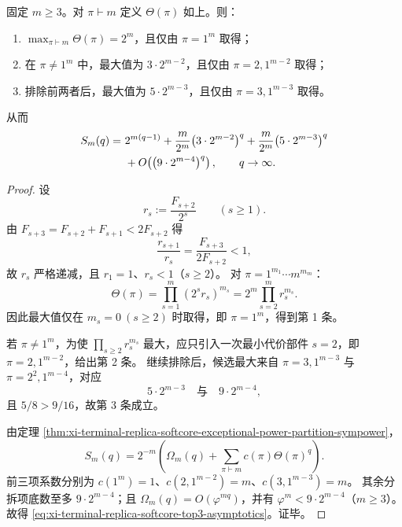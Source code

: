 \begin{theorem}\label{thm:xi-terminal-replica-softcore-partition-weight-hierarchy-asymptotics}
固定 \(m\ge 3\)。对 \(\pi\vdash m\) 定义 \(\Theta(\pi)\) 如上。则：
\begin{enumerate}
\item \(\max_{\pi\vdash m}\Theta(\pi)=2^m\)，且仅由 \(\pi=1^m\) 取得；
\item 在 \(\pi\neq 1^m\) 中，最大值为 \(3\cdot 2^{m-2}\)，且仅由 \(\pi=2,1^{m-2}\) 取得；
\item 排除前两者后，最大值为 \(5\cdot 2^{m-3}\)，且仅由 \(\pi=3,1^{m-3}\) 取得。
\end{enumerate}
从而
\begin{align}
S_m(q)
=&\ 2^{m(q-1)}
+\frac{m}{2^m}\bigl(3\cdot 2^{m-2}\bigr)^q
+\frac{m}{2^m}\bigl(5\cdot 2^{m-3}\bigr)^q\notag\\
&\ +O\!\left(\bigl(9\cdot 2^{m-4}\bigr)^q\right),
\qquad q\to\infty.\label{eq:xi-terminal-replica-softcore-top3-asymptotics}
\end{align}
\end{theorem}
\begin{proof}
设
\[
r_s:=\frac{F_{s+2}}{2^s}\qquad(s\ge 1).
\]
由 \(F_{s+3}=F_{s+2}+F_{s+1}<2F_{s+2}\) 得
\[
\frac{r_{s+1}}{r_s}=\frac{F_{s+3}}{2F_{s+2}}<1,
\]
故 \(r_s\) 严格递减，且 \(r_1=1\)、\(r_s<1\)（\(s\ge 2\)）。
对 \(\pi=1^{m_1}\cdots m^{m_m}\)：
\[
\Theta(\pi)
=\prod_{s=1}^{m}(2^s r_s)^{m_s}
=2^m\prod_{s=2}^{m}r_s^{m_s}.
\]
因此最大值仅在 \(m_s=0\ (s\ge 2)\) 时取得，即 \(\pi=1^m\)，得到第 1 条。

若 \(\pi\neq 1^m\)，为使 \(\prod_{s\ge2}r_s^{m_s}\) 最大，应只引入一次最小代价部件 \(s=2\)，即 \(\pi=2,1^{m-2}\)，给出第 2 条。
继续排除后，候选最大来自 \(\pi=3,1^{m-3}\) 与 \(\pi=2^2,1^{m-4}\)，对应
\[
5\cdot 2^{m-3}\quad\text{与}\quad 9\cdot 2^{m-4},
\]
且 \(5/8>9/16\)，故第 3 条成立。

由定理 \ref{thm:xi-terminal-replica-softcore-exceptional-power-partition-sympower}，
\[
S_m(q)=2^{-m}\!\left(\Omega_m(q)+\sum_{\pi\vdash m}c(\pi)\Theta(\pi)^q\right).
\]
前三项系数分别为 \(c(1^m)=1\)、\(c(2,1^{m-2})=m\)、\(c(3,1^{m-3})=m\)。
其余分拆项底数至多 \(9\cdot 2^{m-4}\)；且 \(\Omega_m(q)=O(\varphi^{mq})\)，并有
\(
\varphi^m<9\cdot 2^{m-4}
\)（\(m\ge3\)）。
故得 \eqref{eq:xi-terminal-replica-softcore-top3-asymptotics}。证毕。
\end{proof}

